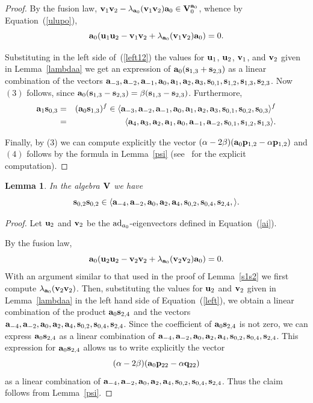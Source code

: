 \documentclass[a4paper]{amsart}
\newtheorem{lemma}{Lemma}[section]
\newcommand{\Vo}{{\bf V}}
\newcommand{\ad}{{\rm ad}}
\newcommand{\al}{\alpha}
\newcommand{\bt}{\beta}
\newcommand{\bv}{{\bf v}}
\newcommand{\ba}{{\bf a}}
\newcommand{\bu}{{\bf u}}
\newcommand{\bs}{{\bf s}}
\newcommand{\bp}{{\bf p}}
\newcommand{\bq}{{\bf q}}
\begin{document}
\begin{proof}
By the fusion law, $ \bv_1 \bv_2 - \lambda_{\ba_0}(\bv_1 \bv_2)\ba_0 \in \Vo_{0}^{\ba_0}$, whence by Equation~(\ref{ulupo}), 
 \begin{equation}
 \label{left12}
 \ba_0(\bu_1 \bu_2 - \bv_1 \bv_2 + \lambda_{\ba_0}(\bv_1 \bv_2)\ba_0)=0.
 \end{equation} 
 
Substituting  in the left side of~(\ref{left12}) the values for $\bu_1$, $\bu_2$, $\bv_1$, and $\bv_2$ given in Lemma~\ref{lambdaa} we get an expression of  $\ba_0(\bs_{1,3}+\bs_{2,3})$ as a linear combination of the vectors $\ba_{-3}, \ba_{-2}, \ba_{-1}, \ba_0, \ba_1, \ba_2, \ba_3, \bs_{0,1}, \bs_{1,2}, \bs_{1,3}, \bs_{2,3} $. Now $(3)$ follows, since $\ba_0(\bs_{1,3}-\bs_{2,3})=\bt(\bs_{1,3}-\bs_{2,3})$. Furthermore,
\begin{eqnarray*}
\ba_1\bs_{0,3}&=&(\ba_0\bs_{1,3})^f\in \langle  \ba_{-3}, \ba_{-2},  \ba_{-1}, \ba_0, \ba_1, \ba_2, \ba_3, \bs_{0,1}, \bs_{0,2}, \bs_{0,3} \rangle^f\\
&=&\langle  \ba_{4}, \ba_{3},  \ba_{2}, \ba_1, \ba_0, \ba_{-1}, \ba_{-2}, \bs_{0,1}, \bs_{1,2}, \bs_{1,3} \rangle .
\end{eqnarray*}
 


Finally, by (3) we can compute explicitly the vector $
(\al-2\bt)(\ba_0\bp_{1,2}-\al\bp_{1,2})
$
and $(4)$ follows by the formula in Lemma~\ref{psi} (see~\cite[genericsakuma-4bt.s]{code} for the explicit computation).
\end{proof}

\begin{lemma}\label{s2s2}
In the algebra $\Vo$ we have
$$
\bs_{0,2}\bs_{0,2}\in \langle \ba_{-4}, \ba_{-2} , \ba_{0}, \ba_{2} , \ba_4, \bs_{0,2}, \bs_{0,4}, \bs_{2,4}, \rangle .
$$
\end{lemma}
\begin{proof}
Let $\bu_2$ and $\bv_2$ be the $\ad_{a_0}$-eigenvectors defined in Equation~(\ref{ai}).

 By the fusion law, 
 \begin{equation}
 \label{left}
 \ba_0(\bu_2 \bu_2 - \bv_2 \bv_2 + \lambda_{\ba_0}(\bv_2 \bv_2)\ba_0)=0.
 \end{equation} 
 With an argument similar to that used in the proof of Lemma~\ref{s1s2} we first compute $\lambda_{\ba_0}(\bv_2 \bv_2)$. Then, 
substituting the values for $\bu_2$ and $\bv_2$ given in Lemma~\ref{lambdaa} in the left hand side of Equation~(\ref{left}),  we obtain a linear combination of the product  $\ba_0\bs_{2,4}$ and the vectors $\ba_{-4}, \ba_{-2} , \ba_{0}, \ba_{2} , \ba_4, \bs_{0,2}, \bs_{0,4}, \bs_{2,4}$. Since the coefficient of $\ba_0\bs_{2,4}$ is not zero, we can express $\ba_0\bs_{2,4}$ as a linear combination of $\ba_{-4}, \ba_{-2} , \ba_{0}, \ba_{2} , \ba_4, \bs_{0,2}, \bs_{0,4}, \bs_{2,4}$. This expression for $\ba_0\bs_{2,4}$ allows us to write explicitly  the vector  
$$
(\al-2\bt)(\ba_0\bp_{22}-\al \bq_{22})
$$ as a linear combination of $\ba_{-4}, \ba_{-2} , \ba_{0}, \ba_{2} , \ba_4, \bs_{0,2}, \bs_{0,4}, \bs_{2,4}$. Thus the claim follows from Lemma~\ref{psi}.
\end{proof}
\end{document}
